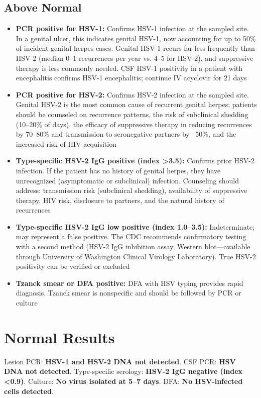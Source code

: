 \subsection*{Above Normal}
\begin{itemize}
  \item \textbf{PCR positive for HSV-1:} Confirms HSV-1 infection at the sampled site. In a genital ulcer, this indicates genital HSV-1, now accounting for up to 50\% of incident genital herpes cases. Genital HSV-1 recurs far less frequently than HSV-2 (median 0--1 recurrences per year vs. 4--5 for HSV-2), and suppressive therapy is less commonly needed. CSF HSV-1 positivity in a patient with encephalitis confirms HSV-1 encephalitis; continue IV acyclovir for 21 days
  \item \textbf{PCR positive for HSV-2:} Confirms HSV-2 infection at the sampled site. Genital HSV-2 is the most common cause of recurrent genital herpes; patients should be counseled on recurrence patterns, the risk of subclinical shedding (10--20\% of days), the efficacy of suppressive therapy in reducing recurrences by 70--80\% and transmission to seronegative partners by ~50\%, and the increased risk of HIV acquisition
  \item \textbf{Type-specific HSV-2 IgG positive (index >3.5):} Confirms prior HSV-2 infection. If the patient has no history of genital herpes, they have unrecognized (asymptomatic or subclinical) infection. Counseling should address: transmission risk (subclinical shedding), availability of suppressive therapy, HIV risk, disclosure to partners, and the natural history of recurrences
  \item \textbf{Type-specific HSV-2 IgG low positive (index 1.0--3.5):} Indeterminate; may represent a false positive. The CDC recommends confirmatory testing with a second method (HSV-2 IgG inhibition assay, Western blot---available through University of Washington Clinical Virology Laboratory). True HSV-2 positivity can be verified or excluded
  \item \textbf{Tzanck smear or DFA positive:} DFA with HSV typing provides rapid diagnosis. Tzanck smear is nonspecific and should be followed by PCR or culture
\end{itemize}

\section*{Normal Results}
Lesion PCR: \textbf{HSV-1 and HSV-2 DNA not detected}. CSF PCR: \textbf{HSV DNA not detected}. Type-specific serology: \textbf{HSV-2 IgG negative (index <0.9)}. Culture: \textbf{No virus isolated at 5--7 days}. DFA: \textbf{No HSV-infected cells detected}.

